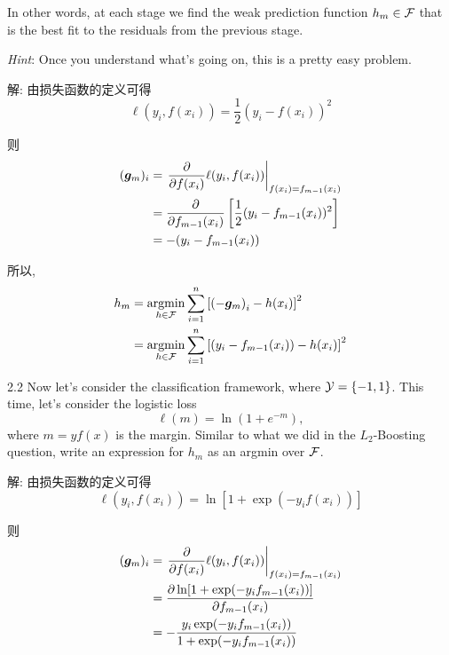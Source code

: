 \documentclass{article}
\begin{document}
In other words, at each stage we find the weak prediction function $h_{m}\in\mathcal{F}$ that is the best fit to the residuals from the previous stage. 

\emph{Hint}: Once you understand what's going on, this is a pretty easy problem.

解: 由损失函数的定义可得
\begin{equation}
  \ell(y_{i},f(x_{i}))
  =\frac{1}{2}(y_{i}-f(x_{i}))^2
\end{equation}

则
\begin{equation}
  \begin{aligned}
    ({\bm{g}}_{m})_i
    &=\left.\frac{\partial}{\partial f(x_{i})}\ell(y_{i},f(x_{i})) \right|_{f(x_{i})=f_{m-1}(x_{i})}\\
    &=\frac{\partial}{\partial f_{m-1}(x_{i})}\left[\frac{1}{2}(y_{i}-f_{m-1}(x_{i}))^2\right]\\
    &=-(y_{i}-f_{m-1}(x_{i}))\\
  \end{aligned}
\end{equation}

所以,
\begin{equation}
  \begin{aligned}
    h_{m}
    &=\operatorname*{argmin}_{h\in\mathcal{F}}\sum_{i=1}^{n}\left[\left(-{\bm{g}}_{m}\right)_{i}-h(x_{i})\right]^{2}\\
    &=\operatorname*{argmin}_{h\in\mathcal{F}}\sum_{i=1}^{n}\left[(y_{i}-f_{m-1}(x_{i}))-h(x_{i})\right]^{2}\\
  \end{aligned}
\end{equation}

2.2 Now let's consider the classification framework, where $\mathcal{Y}=\{-1,1\} $. This time, let's consider the logistic loss 
\begin{equation}
  \ell(m)=\ln\left(1+e^{-m}\right),
\end{equation}
where $m=yf(x)$ is the margin. Similar to what we did in the $L_{2}$-Boosting question, write an expression for $h_{m}$ as an argmin over $\mathcal{F}$. 

解: 由损失函数的定义可得
\begin{equation}
  \ell(y_{i},f(x_{i}))
  =\ln[1+\exp(-y_if(x_{i}))]
\end{equation}

则
\begin{equation}
  \begin{aligned}
    ({\bm{g}}_{m})_i
    &=\left.\frac{\partial}{\partial f(x_{i})}\ell(y_{i},f(x_{i}))\right|_{f(x_{i})=f_{m-1}(x_{i})}\\
    &=\frac{\partial\ln[1+\exp(-y_if_{m-1}(x_{i}))]}{\partial f_{m-1}(x_{i})}\\
    &=-\frac{y_i\exp(-y_if_{m-1}(x_{i}))}{1+\exp(-y_if_{m-1}(x_{i}))}\\
  \end{aligned}
\end{equation}
\end{document}
